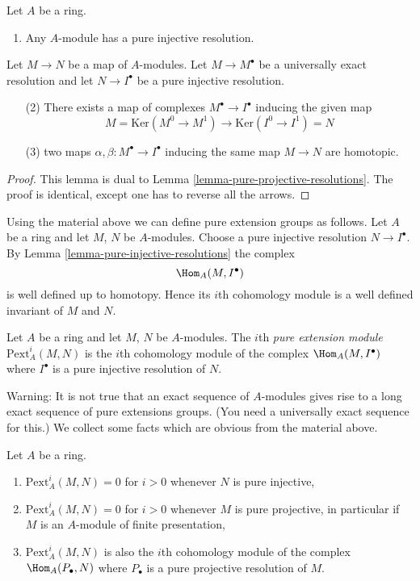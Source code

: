 \begin{lemma}
\label{lemma-pure-injective-resolutions}
Let $A$ be a ring.
\begin{enumerate}
\item Any $A$-module has a pure injective resolution.
\end{enumerate}
Let $M \to N$ be a map of $A$-modules.
Let $M \to M^\bullet$ be a universally exact resolution and
let $N \to I^\bullet$ be a pure injective resolution.
\begin{enumerate}
\item[(2)] There exists a map of complexes $M^\bullet \to I^\bullet$
inducing the given map
$$
M = \text{Ker}(M^0 \to M^1) \to \text{Ker}(I^0 \to I^1) = N
$$
\item[(3)] two maps $\alpha, \beta : M^\bullet \to I^\bullet$
inducing the same map $M \to N$ are homotopic.
\end{enumerate}
\end{lemma}

\begin{proof}
This lemma is dual to
Lemma \ref{lemma-pure-projective-resolutions}.
The proof is identical, except one has to reverse all the arrows.
\end{proof}

\noindent
Using the material above we can define pure extension groups as
follows. Let $A$ be a ring and let $M$, $N$ be $A$-modules.
Choose a pure injective resolution $N \to I^\bullet$. By
Lemma \ref{lemma-pure-injective-resolutions}
the complex
$$
\Hom_A(M, I^\bullet)
$$
is well defined up to homotopy. Hence its $i$th cohomology module
is a well defined invariant of $M$ and $N$.

\begin{definition}
\label{definition-pure-ext}
Let $A$ be a ring and let $M$, $N$ be $A$-modules.
The $i$th {\it pure extension module} $\text{Pext}^i_A(M, N)$
is the $i$th cohomology module of the complex
$\Hom_A(M, I^\bullet)$ where $I^\bullet$ is a pure injective
resolution of $N$.
\end{definition}

\noindent
Warning: It is not true that an exact sequence of $A$-modules gives
rise to a long exact sequence of pure extensions groups. (You need
a universally exact sequence for this.)
We collect some facts which are obvious from the material above.

\begin{lemma}
\label{lemma-facts-pext}
Let $A$ be a ring.
\begin{enumerate}
\item $\text{Pext}^i_A(M, N) = 0$ for $i > 0$ whenever $N$ is pure injective,
\item $\text{Pext}^i_A(M, N) = 0$ for $i > 0$ whenever $M$ is pure projective,
in particular if $M$ is an $A$-module of finite presentation,
\item $\text{Pext}^i_A(M, N)$ is also the $i$th cohomology module
of the complex $\Hom_A(P_\bullet, N)$ where $P_\bullet$
is a pure projective resolution of $M$.
\end{enumerate}
\end{lemma}


